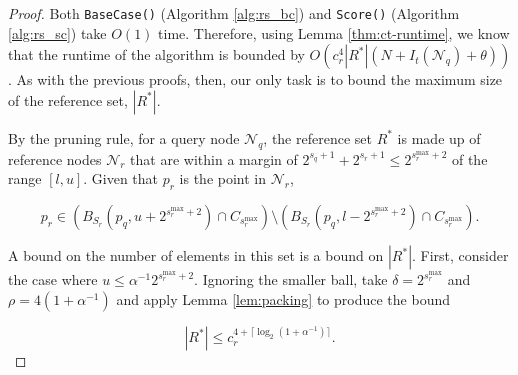\begin{proof}
Both \texttt{BaseCase()} (Algorithm \ref{alg:rs_bc}) and \texttt{Score()}
(Algorithm \ref{alg:rs_sc}) take $O(1)$ time.  Therefore, using Lemma
\ref{thm:ct-runtime}, we know that the runtime of the algorithm is bounded by
$O(c_r^4 |R^*| (N + I_t(\mathscr{N}_q) + \theta))$.  As with the previous
proofs, then, our only task is to bound the maximum size of the reference set,
$|R^*|$.

By the pruning rule, for a query node $\mathscr{N}_q$, the reference set $R^*$
is made up of reference nodes $\mathscr{N}_r$ that are within a margin of
$2^{s_q + 1} + 2^{s_r + 1} \le 2^{s_r^{\max} + 2}$ of the range $[l, u]$.  Given
that $p_r$ is the point in $\mathscr{N}_r$,

\begin{equation}
p_r \in \left( B_{S_r}(p_q, u + 2^{s_r^{\max} + 2}) \cap
C_{s_r^{\max}}\right)\setminus \left( B_{S_r}(p_q, l - 2^{s_r^{\max} + 2}) \cap
C_{s_r^{\max}} \right). \label{eqn:rsballs}
\end{equation}

A bound on the number of elements in this set is a bound on $|R^*|$.  %
First, consider the case where $u \le \alpha^{-1} 2^{s_r^{\max} + 2}$.  Ignoring
the smaller ball, take $\delta = 2^{s_r^{\max}}$ and $\rho = 4 (1 +
\alpha^{-1})$ and apply Lemma \ref{lem:packing} to produce the bound

\begin{equation}
|R^*| \le c_r^{4 + \lceil \log_2(1 + \alpha^{-1}) \rceil}.
\end{equation}



\end{proof}
